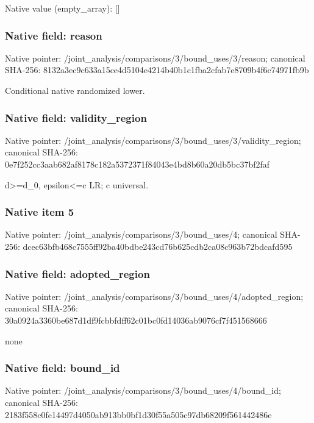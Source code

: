 \documentclass[10pt,a4paper]{article}
\begin{document}
Native value (empty\_\allowbreak{}array): []

\subsubsection{Native field: reason}
Native pointer: /joint\_\allowbreak{}analysis/comparisons/3/bound\_\allowbreak{}uses/3/reason; canonical SHA-256: 8132a3ec9c633a15ce4d5104e4214b40b1c1fba2cfab7e8709b4f6c74971fb9b

\begingroup\raggedright\sloppy Conditional native randomized lower.\par\endgroup

\subsubsection{Native field: validity\_\allowbreak{}region}
Native pointer: /joint\_\allowbreak{}analysis/comparisons/3/bound\_\allowbreak{}uses/3/validity\_\allowbreak{}region; canonical SHA-256: 0e7f252cc3aab682af8178c182a5372371f84043e4bd8b60a20db5bc37bf2faf

\begingroup\raggedright\sloppy d>=\allowbreak{}d\_\allowbreak{}0,\allowbreak{} epsilon<=\allowbreak{}c LR;\allowbreak{} c universal.\par\endgroup

\subsubsection{Native item 5}
Native pointer: /joint\_\allowbreak{}analysis/comparisons/3/bound\_\allowbreak{}uses/4; canonical SHA-256: dcec63bfb468c7555ff92ba40bdbe243cd76b625cdb2ca08c963b72bdcafd595

\subsubsection{Native field: adopted\_\allowbreak{}region}
Native pointer: /joint\_\allowbreak{}analysis/comparisons/3/bound\_\allowbreak{}uses/4/adopted\_\allowbreak{}region; canonical SHA-256: 30a0924a3360be687d1df9fcbbfdff62c01bc0fd14036ab9076cf7f451568666

\begingroup\raggedright\sloppy none\par\endgroup

\subsubsection{Native field: bound\_\allowbreak{}id}
Native pointer: /joint\_\allowbreak{}analysis/comparisons/3/bound\_\allowbreak{}uses/4/bound\_\allowbreak{}id; canonical SHA-256: 2183f558c0fe14497d4050ab913bb0bf1d30f55a505c97db68209f561442486e
\end{document}
